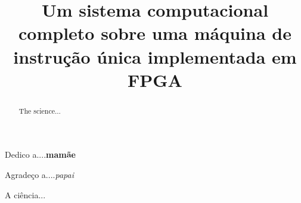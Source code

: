 \documentclass[bacharelado]{unb-cic}
\title{Um sistema computacional completo sobre uma máquina de instrução única implementada em FPGA}
\begin{document}
  \maketitle
  \pretextual

  \begin{dedicatoria}
  Dedico a....\textbf{mamãe}
  \end{dedicatoria}

  \begin{agradecimentos}
  Agradeço a....\textit{papai}
  \end{agradecimentos}

  \begin{resumo}
  A ciência...
  \end{resumo}

  \begin{abstract}
  The science...
  \end{abstract}

  \tableofcontents
  \listoffigures
  \listoftables

  \textual
  
  
  
  
  

  \postextual
  
  
\end{document}
